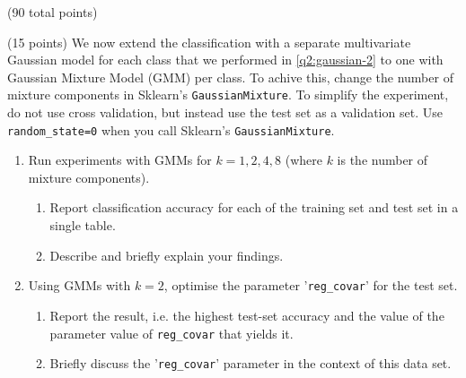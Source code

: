 \documentclass[12pt]{article}
\begin{document}
\begin{question}{(90 total points) \qTwoTitle}
\begin{subquestion}{(15 points)
    We now extend the classification with a separate multivariate Gaussian model for each class that we performed in \ref{q2:gaussian-2} to one with Gaussian Mixture Model (GMM) per class. To achive this, change the number of mixture components in Sklearn's {\tt GaussianMixture}. 
    To simplify the experiment, do not use cross validation, but instead use the test set as a validation set.
    Use {\tt random\_state=0} when you call Sklearn's {\tt GaussianMixture}.
  }
  \begin{enumerate}\NARROWITEM
  \item Run experiments with GMMs for $k = 1,2,4,8$ (where $k$ is the number of mixture components).
    \begin{enumerate}\NARROWITEM
    \item Report classification accuracy for each of the training set and test set in a single table.
    \item Describe and briefly explain your findings.
    \end{enumerate}
  \item Using GMMs with $k=2$, optimise the parameter '{\tt reg\_covar}' for the test set.
    \begin{enumerate}\NARROWITEM
    \item Report the result, i.e. the highest test-set accuracy and the value of the parameter value of {\tt reg\_covar} that yields it.
    \item Briefly discuss the '{\tt reg\_covar}' parameter in the context of this data set.
    \end{enumerate}
  \end{enumerate}
   


\end{subquestion}
\end{question}
\end{document}
